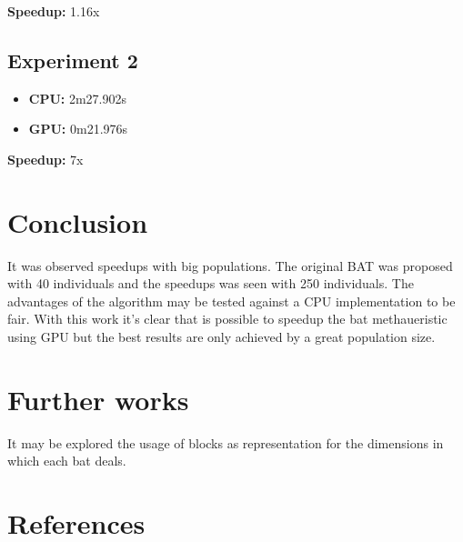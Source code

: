 \documentclass[12pt]{article}
\begin{document}
\textbf{Speedup:} 1.16x

\subsection{Experiment 2}

\begin{itemize}
    \item \textbf{CPU:} 2m27.902s
    \item \textbf{GPU:} 0m21.976s
\end{itemize}

\textbf{Speedup:} 7x

\section{Conclusion}

It was observed speedups with big populations. The original BAT was proposed with 40 individuals and the speedups was seen with 250 individuals.
The advantages of the algorithm may be tested against a CPU implementation to be fair.
With this work it's clear that is possible to speedup the bat methaueristic using GPU but the best results are only achieved by a great population size.

\section{Further works}

It may be explored the usage of blocks as representation for the dimensions in which each bat deals.

\section{References}



\end{document}
